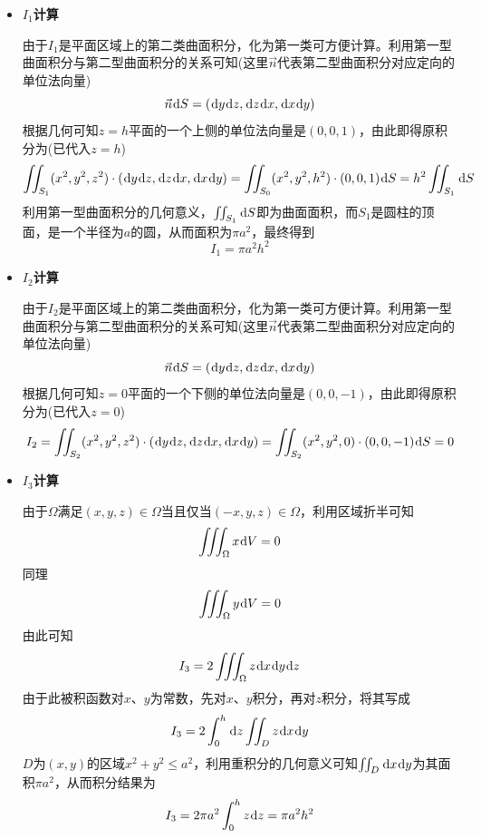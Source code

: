 \documentclass[a4paper,UTF8,fontset=windows,AutoFakeBold]{ctexart}
\newcommand*{\dr}{\hspace{0.07em}\mathrm{d}}
\newcommand*{\nv}{\vec{n}}
\newcommand*{\rb}{\mathbb{R}}
\theoremstyle{ex}
\begin{document}
\begin{enumerate}
{\begin{itemize}
            将被积函数看作$P\dr y\dr z+Q\dr z\dr x+R\dr x\dr y$，由初等函数知$P$、$Q$、$R$在$\rb^3$上可导且导函数连续，直接计算得
            $$P_x+Q_y+R_z=2(x+y+z)$$
            由于积分区域并非封闭曲面，我们补上顶部的
            $$S_1:\quad z=h,\quad x^2+y^2\le a^2$$
            与底部的
            $$S_2:\quad z=0,\quad x^2+y^2\le a^2$$
            并在顶部取上侧为正向、底部取下侧为正向。

            根据定义$S_1$在$S$的上方，$S_2$在$S$的下方，因此$S_1$的上侧、$S$的外侧、$S_2$的下侧构成三者围成的封闭曲面的外侧。设围成的区域为$\Omega$，所求的积分为$I$，并记
            $$I_1=\iint_{S_1}x^2\dr y\dr z+y^2\dr z\dr x+z^2\dr x\dr y$$
            $$I_2=\iint_{S_2}x^2\dr y\dr z+y^2\dr z\dr x+z^2\dr x\dr y$$
            $$I_3=\iiint_\Omega2(x+y+z)\dr V$$
            利用高斯公式有
            $$I_3=I+I_1+I_2$$
            从而$I=I_3-I_1-I_2$。

            \item \textbf{$I_1$计算}
            
            由于$I_1$是平面区域上的第二类曲面积分，化为第一类可方便计算。利用第一型曲面积分与第二型曲面积分的关系可知(这里$\nv$代表第二型曲面积分对应定向的单位法向量)
            $$\nv\dr S=(\dr y\dr z,\dr z\dr x,\dr x\dr y)$$   
            根据几何可知$z=h$平面的一个上侧的单位法向量是$(0,0,1)$，由此即得原积分为(已代入$z=h$)
            $$\iint_{S_1}(x^2,y^2,z^2)\cdot(\dr y\dr z,\dr z\dr x,\dr x\dr y)=\iint_{S_0}(x^2,y^2,h^2)\cdot(0,0,1)\dr S=h^2\iint_{S_1}\dr S$$
            利用第一型曲面积分的几何意义，$\iint_{S_1}\dr S$即为曲面面积，而$S_1$是圆柱的顶面，是一个半径为$a$的圆，从而面积为$\pi a^2$，最终得到
            $$I_1=\pi a^2h^2$$

            \item \textbf{$I_2$计算}
            
            由于$I_2$是平面区域上的第二类曲面积分，化为第一类可方便计算。利用第一型曲面积分与第二型曲面积分的关系可知(这里$\nv$代表第二型曲面积分对应定向的单位法向量)
            $$\nv\dr S=(\dr y\dr z,\dr z\dr x,\dr x\dr y)$$   
            根据几何可知$z=0$平面的一个下侧的单位法向量是$(0,0,-1)$，由此即得原积分为(已代入$z=0$)
            $$I_2=\iint_{S_2}(x^2,y^2,z^2)\cdot(\dr y\dr z,\dr z\dr x,\dr x\dr y)=\iint_{S_2}(x^2,y^2,0)\cdot(0,0,-1)\dr S=0$$

            \item \textbf{$I_3$计算}
            
            由于$\Omega$满足$(x,y,z)\in\Omega$当且仅当$(-x,y,z)\in\Omega$，利用区域折半可知
            $$\iiint_\Omega x\dr V=0$$
            同理
            $$\iiint_\Omega y\dr V=0$$
            由此可知
            $$I_3=2\iiint_\Omega z\dr x\dr y\dr z$$
            由于此被积函数对$x$、$y$为常数，先对$x$、$y$积分，再对$z$积分，将其写成
            $$I_3=2\int_0^h \dr z\iint_Dz\dr x\dr y$$
            $D$为$(x,y)$的区域$x^2+y^2\le a^2$，利用重积分的几何意义可知$\iint_D\dr x\dr y$为其面积$\pi a^2$，从而积分结果为
            $$I_3=2\pi a^2\int_0^hz\dr z=\pi a^2h^2$$


\end{itemize}}
\end{enumerate}
\end{document}
